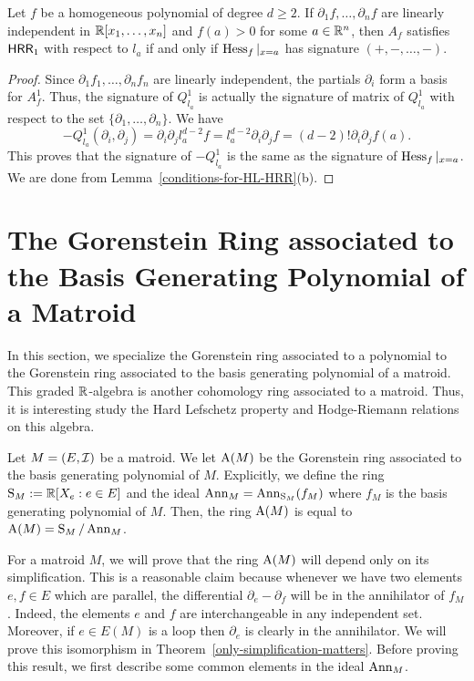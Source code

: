 \documentclass{puthesis-UG}
\begin{document}
\begin{cor} \label{partial-independent-implies-hessian}
	Let $f$ be a homogeneous polynomial of degree $d \geq 2$. If $\partial_1 f, \ldots, \partial_n f$ are linearly independent in $\mathbb{R}[x_1, \ldots, x_n]$ and $f(a) > 0$ for some $a \in \mathbb{R}^n$, then $A_f$ satisfies $\mathsf{HRR}_1$ with respect to $l_a$ if and only if $\operatorname{Hess}_f|_{x = a}$ has signature $(+, -, \ldots, -)$. 
\end{cor}

\begin{proof}
	Since $\partial_1 f_1, \ldots, \partial_n f_n$ are linearly independent, the partials $\partial_i$ form a basis for $A_f^1$. Thus, the signature of $Q_{l_a}^1$ is actually the signature of matrix of $Q_{l_a}^1$ with respect to the set $\{\partial_1, \ldots, \partial_n\}.$ We have 
	\[
		-Q_{l_a}^1(\partial_i, \partial_j) = \partial_i \partial_j l_a^{d-2} f =  l_a^{d-2} \partial_i \partial_j f = (d-2)! \partial_i \partial_j f(a).
	\]
	This proves that the signature of $-Q^1_{l_a}$ is the same as the signature of $\operatorname{Hess}_f |_{x = a}$.  We are done from Lemma~\ref{conditions-for-HL-HRR}(b).
\end{proof}

\section{The Gorenstein Ring associated to the Basis Generating Polynomial of a Matroid} \label{sec:gorenstein-ring-of-matroid}

In this section, we specialize the Gorenstein ring associated to a polynomial to the Gorenstein ring associated to the basis generating polynomial of a matroid. This graded $\mathbb{R}$-algebra is another cohomology ring associated to a matroid. Thus, it is interesting study the Hard Lefschetz property and Hodge-Riemann relations on this algebra. 

\begin{defn} \label{defn:basis-cohomology}
	Let $M = (E, \mathcal{I})$ be a matroid. We let $\operatorname{A}(M)$ be the Gorenstein ring associated to the basis generating polynomial of $M$. Explicitly, we define the ring $\operatorname{S}_M := \mathbb{R} [X_e : e \in E]$ and the ideal $\operatorname{Ann}_M = \operatorname{Ann}_{\operatorname{S}_M}(f_M)$ where $f_M$ is the basis generating polynomial of $M$. Then, the ring $\operatorname{A}(M)$ is equal to $\operatorname{A}(M) = \operatorname{S}_M / \operatorname{Ann}_M$.
\end{defn}

For a matroid $M$, we will prove that the ring $\operatorname{A}(M)$ will depend only on its simplification. This is a reasonable claim because whenever we have two elements $e, f \in E$ which are parallel, the differential $\partial_e - \partial_f$ will be in the annihilator of $f_M$. Indeed, the elements $e$ and $f$ are interchangeable in any independent set. Moreover, if $e \in E(M)$ is a loop then $\partial_e$ is clearly in the annihilator. We will prove this isomorphism in Theorem~\ref{only-simplification-matters}. Before proving this result, we first describe some common elements in the ideal $\operatorname{Ann}_M$. 
\end{document}
